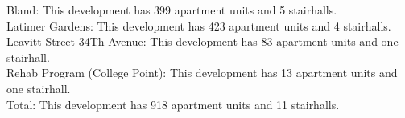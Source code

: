 {Bland}: This development has 399 apartment units and 5 stairhalls.\\{Latimer Gardens}: This development has 423 apartment units and 4 stairhalls.\\{Leavitt Street-34Th Avenue}: This development has 83 apartment units and one stairhall.\\{Rehab Program (College Point)}: This development has 13 apartment units and one stairhall.\\{Total}: This development has 918 apartment units and 11 stairhalls.\\